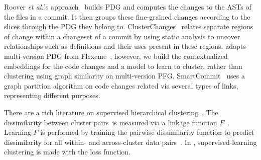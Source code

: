 \vspace{1pt}
 Roover {\em et al.}'s
approach~\cite{roover-scam18} builds PDG and computes the changes to
the ASTs of the files in a commit. It then groups these fine-grained
changes according to the slices through the PDG they belong to.
ClusterChanges~\cite{barnett-icse15} relates separate regions of
change within a changeset of a commit by using static analysis to
uncover relationships such as definitions and their uses present in
these regions. {\tool} adapts multi-version PDG from
Flexeme~\cite{flexeme-fse20}, however, we build the contextualized
embeddings for the code changes and a model to learn to cluster,
rather than clustering using graph similarity on multi-version PFG.
SmartCommit~\cite{smartcommit-fse21} uses a graph partition algorithm
on code changes related via several types of links, representing
different purposes.

There are a rich literature on supervised hierarchical
clustering~\cite{pmlr-v97-yadav19a,finley-icml05,liu13,GuhaIBB15,kenyon-dean-etal-2018-resolving,tie19}.
The dissimilarity between cluster pairs~is measured via a linkage
function $F$~\cite{GuhaIBB15,pmlr-v97-yadav19a}. Learning
$F$ is performed by training the pairwise
dissimilarity function to predict dissimilarity for all within- and
across-cluster data
pairs~\cite{pmlr-v97-yadav19a,kenyon-dean-etal-2018-resolving}.
In {\tool}, supervised-learning clustering is made with the loss
function.


